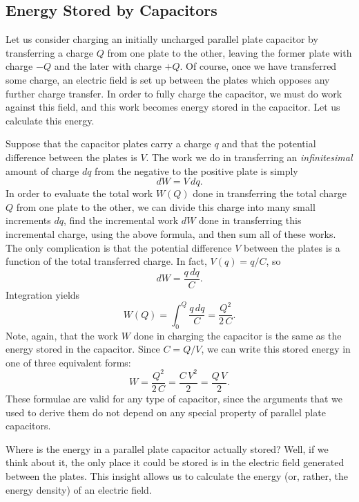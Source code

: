 \subsection{Energy Stored by Capacitors}
Let us consider charging an initially uncharged  parallel plate 
capacitor by transferring a charge $Q$ from one
plate to the other, leaving the former plate with charge $-Q$ and the later
 with  charge $+Q$. Of course, 
once we have transferred some charge, an electric field is set up between
the plates which opposes any further  charge transfer.  In order to fully
charge the capacitor, we must do
work against this field, and this work becomes
 energy stored in the capacitor. Let us calculate this
energy.

Suppose that the capacitor plates carry a charge $q$ and that the
potential difference between the plates is $V$. The work we do in transferring
an {\em infinitesimal}\/ amount of charge $dq$ from the negative to the
positive plate is simply
\begin{equation}
dW = V\,dq.
\end{equation}
In order to evaluate the total work $W(Q)$ done in transferring
the total  charge $Q$ from one plate to the other, we can divide this charge into many small
increments $dq$, find the incremental work 
$dW$ done in transferring this incremental charge,
using the above formula, and
then sum all of these works. The only complication is that the potential
difference $V$ between the plates is a function of the total transferred
charge. In fact, $V(q) = q/C$, so
\begin{equation}
dW =\frac{q\,dq}{C}.
\end{equation}
Integration  yields
\begin{equation}
W(Q) = \int_0^Q\frac{q\,dq}{C}= \frac{Q^2}{2\,C}.
\end{equation}
Note, again, that the work $W$ done in charging the capacitor is
the same as the energy stored in the capacitor. Since $C=Q/V$, we can
write this stored energy  in one of three equivalent forms:
\begin{equation}
W = \frac{Q^2}{2\,C} = \frac{C\,V^2}{2} = \frac{Q \,V}{2}.
\end{equation}
These formulae are valid for any type of capacitor, since the arguments that we used
to derive them do not depend on any special property of parallel plate
capacitors. 

Where is the energy  in a parallel plate 
capacitor actually stored? Well, if we think about
it, the only place it could be stored is in the electric field generated 
between the plates. This insight allows us to calculate the energy (or, rather,
the energy density) of an electric field.

